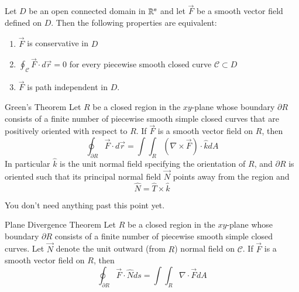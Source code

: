 \documentclass[12pt]{report}
\begin{document}
\begin{appendices}
    
    \begin{thm}{}{}
        Let $D$ be an open connected domain in $\mathbb R^n$ and let $\vec{F}$ be a smooth vector field defined on $D$. Then the following properties are equivalent:\begin{enumerate}
            \item $\vec{F}$ is conservative in $D$ 
            \item $\oint_{\mathcal{C}} \vec{F}\cdot d\vec{r} = 0$ for every piecewise smooth closed curve $\mathcal{C} \subset D$ 
            \item $\vec{F}$ is path independent in $D$.
        \end{enumerate}
    \end{thm}
    
    \begin{namthm}{Green's Theorem}
        Let $R$ be a closed region in the $xy$-plane whose boundary $\partial R$ consists of a finite number of piecewise smooth simple closed curves that are positively oriented with respect to $R$. If $\vec{F}$ is a smooth vector field on $R$, then \begin{equation}
            \oint_{\partial R}\vec{F}\cdot d\vec{r} = \int\int_{R}(\nabla \times \vec{F})\cdot \hat{k}dA
        \end{equation}
        In particular $\hat{k}$ is the unit normal field specifying the orientation of $R$, and $\partial R$ is oriented such that its principal normal field $\vec{N}$ points away from the region and \begin{equation}
            \hat{N} = \hat{T} \times \hat{k}
        \end{equation}
    \end{namthm}
    
    \begin{rmk}{}{}
        You don't need anything past this point yet.
    \end{rmk}
    
    \begin{namthm}{Plane Divergence Theorem}
        Let $R$ be a closed region in the $xy$-plane whose boundary $\partial R$ consists of a finite number of piecewise smooth simple closed curves. Let $\vec{N}$ denote the unit outward (from $R$) normal field on $\mathcal{C}$. If $\vec{F}$ is a smooth vector field on $R$, then \begin{equation}
            \oint_{\partial R}\vec{F}\cdot \hat{N} ds = \int\int_{R}\nabla \cdot \vec{F}dA
        \end{equation}
    \end{namthm}
    

\end{appendices}
\end{document}

